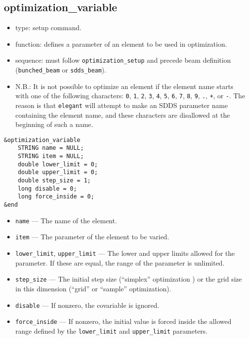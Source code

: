 \documentclass[11pt]{article}
\begin{document}
\subsection{optimization\_variable \label{subsec:optimizationvariable}}

\begin{itemize}
\item type: setup command.
\item function: defines a parameter of an element to be used in optimization.
\item sequence: must follow \verb|optimization_setup| and precede beam definition (\verb|bunched_beam| or \verb|sdds_beam|).
\item N.B.: It is not possible to optimize an element if the element name starts with one of the following
characters: 
\verb|0|, \verb|1|, \verb|2|, \verb|3|, \verb|4|, \verb|5|, \verb|6|, \verb|7|, \verb|8|,
\verb|9|, \verb|.|, \verb|+|, or \verb|-|.  The reason is that {\tt elegant} will attempt to 
make an SDDS parameter name containing the element name, and these characters are disallowed
at the beginning of such a name.
\end{itemize}

\begin{verbatim}
&optimization_variable
    STRING name = NULL;
    STRING item = NULL;
    double lower_limit = 0;
    double upper_limit = 0;
    double step_size = 1;
    long disable = 0;
    long force_inside = 0;
&end
\end{verbatim}

\begin{itemize}
\item \verb|name| --- The name of the element.
\item \verb|item| --- The parameter of the element to be varied.
\item \verb|lower_limit|, \verb|upper_limit| --- The lower and upper limits allowed for the parameter.  If these are
equal, the range of the parameter is unlimited.
\item \verb|step_size| --- The initial step size (``simplex'' optimization ) or the grid size in this dimension (``grid'' or ``sample'' optimization).
\item \verb|disable| --- If nonzero, the covariable is ignored.
\item \verb|force_inside| --- If nonzero, the initial value is forced inside the allowed range defined by the \verb|lower_limit| and \verb|upper_limit| parameters.
\end{itemize}
\end{document}
